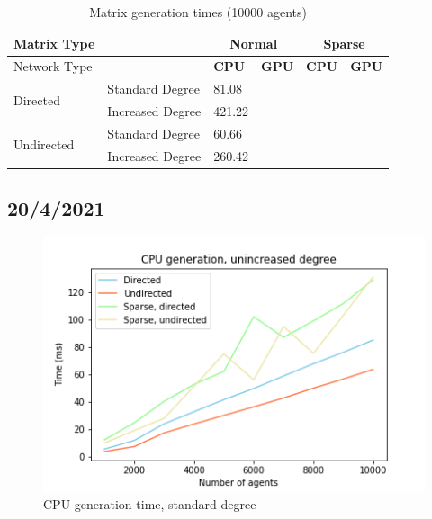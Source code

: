 \documentclass{article}
\begin{document}
\begin{table}[H]
    \centering
    \begin{tabular}{llllll}
        \toprule
        Matrix Type &  & \multicolumn{2}{c}{Normal} & \multicolumn{2}{c}{Sparse}\\
        \midrule 
        Network Type &  &\textbf{CPU} & \textbf{GPU} & \textbf{CPU} & \textbf{GPU} \\
        \midrule
        \multirow{2}{*}{Directed} & Standard Degree & 81.08 & & & \\
                                  & Increased Degree & 421.22 & & & \\
        \multirow{2}{*}{Undirected} & Standard Degree & 60.66 & & & \\
                                  & Increased Degree & 260.42 & & & \\
        \bottomrule
    \end{tabular}
    \label{table:gen_10000}
    \caption{Matrix generation times (10000 agents)}
\end{table}

\subsection{20/4/2021}
\begin{center}
    \begin{figure}[!htbp]
        \centering
        \includegraphics[width=.8\textwidth]{ThesisKI/Images/CPU.png}
        \caption{CPU generation time, standard degree}
        \label{CPU:standard}
    \end{figure}
\end{center}
\end{document}
